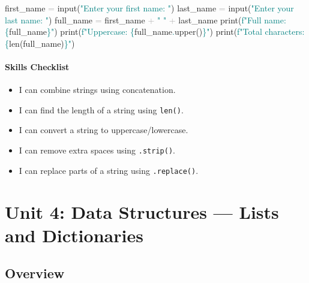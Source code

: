 \documentclass[
  justified,
  openright,
]{tufte-book}
\let\subsubsection\paragraph
\let\paragraph\paragraph
\newcommand{\BuiltInTok}[1]{#1}
\newcommand{\NormalTok}[1]{#1}
\newcommand{\OperatorTok}[1]{\textcolor{DarkGray}{#1}}
\newcommand{\SpecialCharTok}[1]{\textcolor{Teal}{#1}}
\newcommand{\SpecialStringTok}[1]{\textcolor{Teal}{#1}}
\newcommand{\StringTok}[1]{\textcolor{Teal}{#1}}
\newenvironment{Shaded}{%
  \begin{snugshade}
}{%
  \end{snugshade}
}
\let\subsubsection\paragraph
\let\paragraph\paragraph
\providecommand{\tightlist}{%
  \setlength{\itemsep}{0pt}\setlength{\parskip}{0pt}}
\begin{document}
\begin{Shaded}
\begin{Highlighting}[]
\NormalTok{first\_name }\OperatorTok{=} \BuiltInTok{input}\NormalTok{(}\StringTok{"Enter your first name: "}\NormalTok{)}
\NormalTok{last\_name }\OperatorTok{=} \BuiltInTok{input}\NormalTok{(}\StringTok{"Enter your last name: "}\NormalTok{)}
\NormalTok{full\_name }\OperatorTok{=}\NormalTok{ first\_name }\OperatorTok{+} \StringTok{" "} \OperatorTok{+}\NormalTok{ last\_name}
\BuiltInTok{print}\NormalTok{(}\SpecialStringTok{f"Full name: }\SpecialCharTok{\{}\NormalTok{full\_name}\SpecialCharTok{\}}\SpecialStringTok{"}\NormalTok{)}
\BuiltInTok{print}\NormalTok{(}\SpecialStringTok{f"Uppercase: }\SpecialCharTok{\{}\NormalTok{full\_name}\SpecialCharTok{.}\NormalTok{upper()}\SpecialCharTok{\}}\SpecialStringTok{"}\NormalTok{)}
\BuiltInTok{print}\NormalTok{(}\SpecialStringTok{f"Total characters: }\SpecialCharTok{\{}\BuiltInTok{len}\NormalTok{(full\_name)}\SpecialCharTok{\}}\SpecialStringTok{"}\NormalTok{)}
\end{Highlighting}
\end{Shaded}

\subsubsection{Skills Checklist}\label{skills-checklist-16}

\begin{itemize}
\tightlist
\item[$\square$]
  I can combine strings using concatenation.
\item[$\square$]
  I can find the length of a string using \texttt{len()}.
\item[$\square$]
  I can convert a string to uppercase/lowercase.
\item[$\square$]
  I can remove extra spaces using \texttt{.strip()}.
\item[$\square$]
  I can replace parts of a string using \texttt{.replace()}.
\end{itemize}

\newpage

\section{Unit 4: Data Structures --- Lists and
Dictionaries}\label{unit-4-data-structures-lists-and-dictionaries-1}

\subsection{Overview}\label{overview-4}
\end{document}
